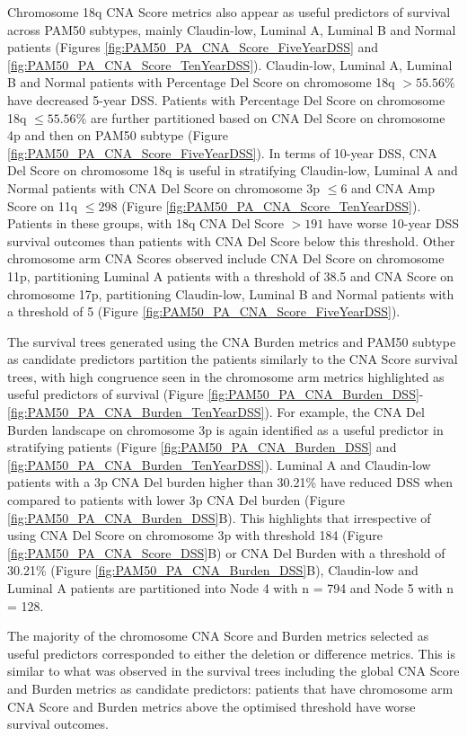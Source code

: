 Chromosome 18q CNA Score metrics also appear as useful predictors of survival across PAM50 subtypes, mainly Claudin-low, Luminal A, Luminal B and Normal patients (Figures \ref{fig:PAM50_PA_CNA_Score_FiveYearDSS} and \ref{fig:PAM50_PA_CNA_Score_TenYearDSS}). Claudin-low, Luminal A, Luminal B and Normal patients with Percentage Del Score on chromosome 18q $>55.56\%$ have decreased 5-year DSS. Patients with Percentage Del Score on chromosome 18q $\leq 55.56\%$ are further partitioned based on CNA Del Score on chromosome 4p and then on PAM50 subtype (Figure \ref{fig:PAM50_PA_CNA_Score_FiveYearDSS}). In terms of 10-year DSS, CNA Del Score on chromosome 18q is useful in stratifying Claudin-low, Luminal A and Normal patients with CNA Del Score on chromosome 3p $\leq 6$ and CNA Amp Score on 11q $\leq 298$ (Figure \ref{fig:PAM50_PA_CNA_Score_TenYearDSS}). Patients in these groups, with 18q CNA Del Score $> 191$ have worse 10-year DSS survival outcomes than patients with CNA Del Score below this threshold. Other chromosome arm CNA Scores observed include CNA Del Score on chromosome 11p, partitioning Luminal A patients with a threshold of 38.5 and CNA Score on chromosome 17p, partitioning Claudin-low, Luminal B and Normal patients with a threshold of 5 (Figure \ref{fig:PAM50_PA_CNA_Score_FiveYearDSS}). 

The survival trees generated using the CNA Burden metrics and PAM50 subtype as candidate predictors partition the patients similarly to the CNA Score survival trees, with high congruence seen in the chromosome arm metrics highlighted as useful predictors of survival (Figure \ref{fig:PAM50_PA_CNA_Burden_DSS}-\ref{fig:PAM50_PA_CNA_Burden_TenYearDSS}). For example, the CNA Del Burden landscape on chromosome 3p is again identified as a useful predictor in stratifying patients (Figure \ref{fig:PAM50_PA_CNA_Burden_DSS} and \ref{fig:PAM50_PA_CNA_Burden_TenYearDSS}). Luminal A and Claudin-low patients with a 3p CNA Del burden higher than 30.21\% have reduced DSS when compared to patients with lower 3p CNA Del burden (Figure \ref{fig:PAM50_PA_CNA_Burden_DSS}B). This highlights that irrespective of using CNA Del Score on chromosome 3p with threshold 184 (Figure \ref{fig:PAM50_PA_CNA_Score_DSS}B) or CNA Del Burden with a threshold of 30.21\%  (Figure \ref{fig:PAM50_PA_CNA_Burden_DSS}B), Claudin-low and Luminal A patients are partitioned into Node 4 with n = 794 and Node 5 with n = 128.   

The majority of the chromosome CNA Score and Burden metrics selected as useful predictors corresponded to either the deletion or difference metrics. This is similar to what was observed in the survival trees including the global CNA Score and Burden metrics as candidate predictors: patients that have chromosome arm CNA Score and Burden metrics above the optimised threshold have worse survival outcomes.

